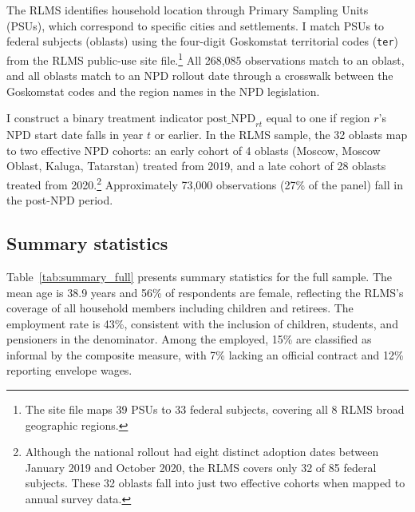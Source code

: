 \documentclass[12pt]{article}
\begin{document}
The RLMS identifies household location through Primary Sampling Units (PSUs), which correspond to specific cities and settlements. I match PSUs to federal subjects (oblasts) using the four-digit Goskomstat territorial codes (\texttt{ter}) from the RLMS public-use site file.\footnote{The site file maps 39 PSUs to 33 federal subjects, covering all 8 RLMS broad geographic regions.} All 268,085 observations match to an oblast, and all oblasts match to an NPD rollout date through a crosswalk between the Goskomstat codes and the region names in the NPD legislation.

I construct a binary treatment indicator $\text{post\_NPD}_{rt}$ equal to one if region $r$'s NPD start date falls in year $t$ or earlier. In the RLMS sample, the 32 oblasts map to two effective NPD cohorts: an early cohort of 4 oblasts (Moscow, Moscow Oblast, Kaluga, Tatarstan) treated from 2019, and a late cohort of 28 oblasts treated from 2020.\footnote{Although the national rollout had eight distinct adoption dates between January 2019 and October 2020, the RLMS covers only 32 of 85 federal subjects. These 32 oblasts fall into just two effective cohorts when mapped to annual survey data.} Approximately 73,000 observations (27\% of the panel) fall in the post-NPD period.

\subsection{Summary statistics}

Table~\ref{tab:summary_full} presents summary statistics for the full sample. The mean age is 38.9 years and 56\% of respondents are female, reflecting the RLMS's coverage of all household members including children and retirees. The employment rate is 43\%, consistent with the inclusion of children, students, and pensioners in the denominator. Among the employed, 15\% are classified as informal by the composite measure, with 7\% lacking an official contract and 12\% reporting envelope wages.
\end{document}
